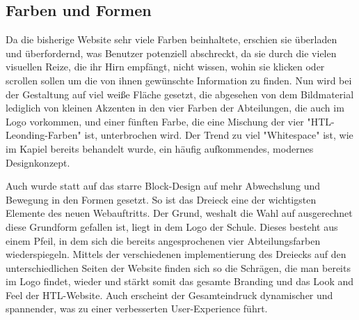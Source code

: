 \subsection{Farben und Formen}
Da die bisherige Website sehr viele Farben beinhaltete, erschien sie überladen und überfordernd, was Benutzer potenziell abschreckt, da sie durch die 
vielen visuellen Reize, die ihr Hirn empfängt, nicht wissen, wohin sie klicken oder scrollen sollen um die von ihnen gewünschte Information zu finden.
Nun wird bei der Gestaltung auf viel weiße Fläche gesetzt, die abgesehen von dem Bildmaterial lediglich von kleinen Akzenten 
in den vier Farben der Abteilungen, die auch im Logo vorkommen, und einer fünften Farbe, die eine Mischung der vier 
"HTL-Leonding-Farben" ist, unterbrochen wird. Der Trend zu viel "Whitespace" ist, wie im Kapiel  bereits
behandelt wurde, ein häufig aufkommendes, modernes Designkonzept.

Auch wurde statt auf das starre Block-Design auf mehr Abwechslung und Bewegung in den Formen gesetzt.
So ist das Dreieck eine der wichtigsten Elemente des neuen Webauftritts. Der Grund, weshalt die Wahl 
auf ausgerechnet diese Grundform gefallen ist, liegt in dem Logo der Schule. Dieses besteht aus einem Pfeil,
in dem sich die bereits angesprochenen vier Abteilungsfarben wiederspiegeln. Mittels der verschiedenen
implementierung des Dreiecks auf den unterschiedlichen Seiten der Website finden sich so die Schrägen,
die man bereits im Logo findet, wieder und stärkt somit das gesamte Branding und das Look and Feel der HTL-Website. Auch erscheint der Gesamteindruck
dynamischer und spannender, was zu einer verbesserten User-Experience führt.

